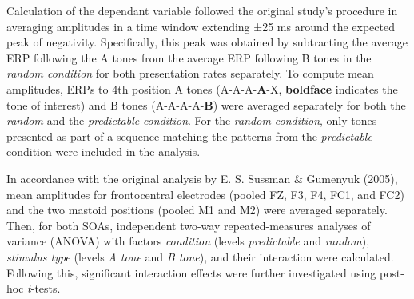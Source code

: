 \documentclass[twoside, man, a4paper,12pt, nofontenc]{apa7}
\begin{document}
Calculation of the dependant variable followed the original study's
procedure in averaging amplitudes in a time window extending ±25 ms
around the expected peak of negativity. Specifically, this peak was
obtained by subtracting the average ERP following the A tones from the
average ERP following B tones in the \emph{random condition} for both
presentation rates separately. To compute mean amplitudes, ERPs to 4th
position A tones (A-A-A-\textbf{A}-X, \textbf{boldface} indicates the
tone of interest) and B tones (A-A-A-A-\textbf{B}) were averaged
separately for both the \emph{random} and the \emph{predictable}
\emph{condition}. For the \emph{random condition}, only tones presented
as part of a sequence matching the patterns from the \emph{predictable}
condition were included in the analysis.

In accordance with the original analysis by E. S. Sussman \& Gumenyuk
(2005), mean amplitudes for frontocentral electrodes (pooled FZ, F3, F4,
FC1, and FC2) and the two mastoid positions (pooled M1 and M2) were
averaged separately. Then, for both SOAs, independent two-way
repeated-measures analyses of variance (ANOVA) with factors
\emph{condition} (levels \emph{predictable} and \emph{random}),
\emph{stimulus type} (levels \emph{A tone} and \emph{B tone}), and their
interaction were calculated. Following this, significant interaction
effects were further investigated using post-hoc \emph{t}-tests.
\end{document}
